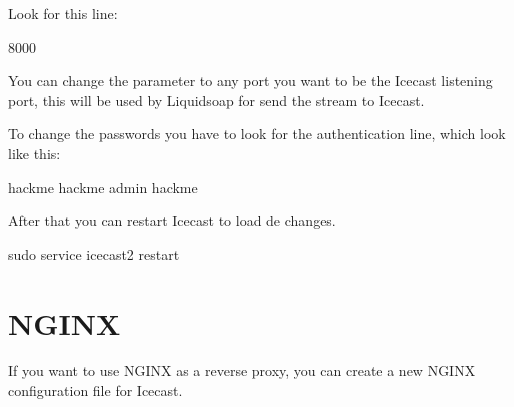 \documentclass[letterpaper,10pt,english]{sphinxmanual}
\begin{document}
\sphinxAtStartPar
Look for this line:

\begin{sphinxVerbatim}[commandchars=\\\{\}]
    8000
\end{sphinxVerbatim}

\sphinxAtStartPar
You can change the  parameter to any port you want to be the Icecast listening port, this will be
used by Liquidsoap for send the stream to Icecast.

\sphinxAtStartPar
To change the passwords you have to look for the authentication line, which look like this:

\begin{sphinxVerbatim}[commandchars=\\\{\}]
    hackme
    hackme
    admin
    hackme
\end{sphinxVerbatim}

\sphinxAtStartPar
After that you can restart Icecast to load de changes.

\begin{sphinxVerbatim}[commandchars=\\\{\}]
sudo service icecast2 restart
\end{sphinxVerbatim}


\section{NGINX}
\label{\detokenize{server_config:nginx}}
\sphinxAtStartPar
If you want to use NGINX as a reverse proxy, you can create a new NGINX configuration file for Icecast.
\end{document}
